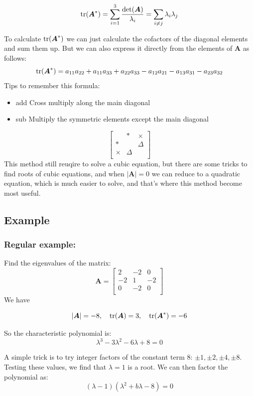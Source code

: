 \documentclass{article}
\begin{document}
\[
	\operatorname{tr}(\boldsymbol{A}^{*}) = \sum_{i=1}^{3} \frac{\det(\boldsymbol A)}{\lambda_i} 
	= \sum_{i \neq j} \lambda_i \lambda_j
\]

To calculate \( \operatorname{tr}(\boldsymbol{A}^{*}) \) we can just calculate the cofactors 
of the diagonal elements and sum them up. But we can also express it directly 
from the elements of \( \boldsymbol A\) as follows:
\[
	\operatorname{tr}(\boldsymbol{A}^{*}) =
	a_{11}a_{22} + a_{11}a_{33} + a_{22}a_{33} - a_{12}a_{21} - a_{13}a_{31} - a_{23}a_{32}
\]
Tips to remember this formula:
\begin{itemize}
		\item add Cross multiply along the main diagonal
		\item sub Multiply the symmetric elements except the main diagonal
\end{itemize}

\[
\begin{bmatrix}
	 & * & \times \\
	* &  & \Delta \\
	\times & \Delta &  \\
\end{bmatrix}
\] 
This method still reuqire to solve a cubic equation, but there are some tricks
to find roots of cubic equations, and when $|\boldsymbol{A}|=0$ we can reduce
to a quadratic equation, which is much easier to solve, and that's where this
method become most useful.

\subsection{Example}

\subsubsection{Regular example:} Find the eigenvalues of the matrix:
\[
	\boldsymbol A = \begin{bmatrix}
		2 & -2 & 0 \\
		-2 & 1 & -2\\
		0 & -2 & 0\\
	\end{bmatrix}
\]
We have

\[
|\boldsymbol{A}|=-8, \quad \operatorname{tr}(\boldsymbol A)=3, \quad
\operatorname{tr}(\boldsymbol{A}^{*})=-6
\] 

So the characteristic polynomial is:
\[
	\lambda^3 - 3\lambda^2 - 6\lambda + 8 = 0
\]

A simple trick is to try integer factors of the constant term \( 8 \):
\( \pm 1, \pm 2, \pm 4, \pm 8 \). Testing these values, we find that \( \lambda = 1 \)
is a root. We can then factor the polynomial as:
\[
	(\lambda - 1)(\lambda^2+b\lambda-8) = 0
\]
\end{document}
